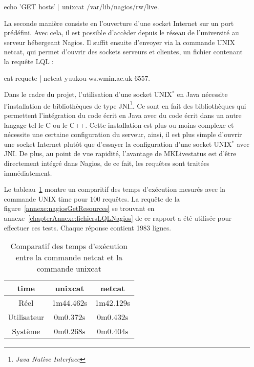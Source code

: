 \begin{center}
	\textsf{echo 'GET hosts' | unixcat /var/lib/nagios/rw/live}.

\end{center}

La seconde mani\`ere consiste en l'ouverture d'une socket Internet sur un port pr\'ed\'efini.
Avec cela, il est possible d'acc\`eder depuis le r\'eseau de l'universit\'e au serveur h\'ebergeant Nagios.
Il suffit ensuite d'envoyer via la commande UNIX \textsf{netcat}, qui permet d'ouvrir des sockets serveurs et clientes, un fichier contenant la requ\^ete LQL :

\begin{center}
	\textsf{cat requete | netcat yuukou-ws.wmin.ac.uk 6557}.

\end{center}

Dans le cadre du projet, l'utilisation d'une socket UNIX$^*$ en Java n\'ecessite l'installation de biblioth\`eques de type JNI\protect\footnote{\textit{Java Native Interface}}.
Ce sont en fait des biblioth\`eques qui permettent l'int\'egration du code \'ecrit en Java avec du code \'ecrit dans un autre langage tel le C ou le C++.
Cette installation est plus ou moins complexe et n\'ecessite une certaine configuration du serveur, ainsi, il est plus simple d'ouvrir une socket Internet plut\^ot que d'essayer la configuration d'une socket UNIX$^*$ avec JNI.
De plus, au point de vue rapidit\'e, l'avantage de MKLivestatus est d'\^etre directement int\'egr\'e dans Nagios, de ce fait, les requ\^etes sont trait\'ees imm\'ediatement.

Le tableau~\ref{table:comparatifTemps} montre un comparitif des temps d'ex\'ecution mesur\'es avec la commande UNIX \textsf{time} pour 100 requ\^etes.
La requ\^ete de la figure~\ref{annexe:nagiosGetResources} se trouvant en annexe~\ref{chapterAnnexe:fichiersLQLNagios} de ce rapport a \'et\'e utilis\'ee pour effectuer ces tests.
Chaque r\'eponse contient 1983 lignes.

\begin{table}[!ht]
	\centering
	\begin{tabular}{|>{\columncolor{grisclair}}c|c|c|}
		\hline
		\rowcolor{grisclair} \textbf{time} & \textbf{unixcat} & \textbf{netcat}\\
		\hline
		R\'eel & 1m44.462s & 1m42.129s\\
		\hline
		Utilisateur & 0m0.372s & 0m0.432s\\
		\hline
		Syst\`eme & 0m0.268s & 0m0.404s\\
		\hline

	\end{tabular}

	\caption{Comparatif des temps d'ex\'ecution entre la commande \textsf{netcat} et la commande \textsf{unixcat}}
	\label{table:comparatifTemps}

\end{table}


